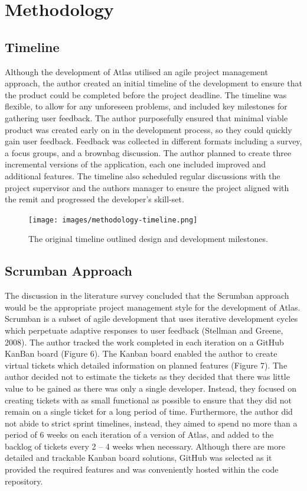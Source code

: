 \documentclass{article}
\begin{document}
\newpage

\section{Methodology}

\subsection{Timeline}

Although the development of Atlas utilised an agile project management approach, the author created an initial timeline of the development to ensure that the product could be completed before the project deadline. The timeline was flexible, to allow for any unforeseen problems, and included key milestones for gathering user feedback. The author purposefully ensured that minimal viable product was created early on in the development process, so they could quickly gain user feedback. Feedback was collected in different formats including a survey, a focus groups, and a brownbag discussion. The author planned to create three incremental versions of the application, each one included improved and additional features. The timeline also scheduled regular discussions with the project supervisor and the authors manager to ensure the project aligned with the remit and progressed the developer's skill-set.

\begin{figure}[!htb]
  \centering
      \texttt{[image: images/methodology-timeline.png]}
  \caption{The original timeline outlined design and development milestones.}
\end{figure}

\subsection{Scrumban Approach}

The discussion in the literature survey concluded that the Scrumban approach would be the appropriate project management style for the development of Atlas. Scrumban is a subset of agile development that uses iterative development cycles which perpetuate adaptive responses to user feedback (Stellman and Greene, 2008). The author tracked the work completed in each iteration on a GitHub KanBan board (Figure 6). The Kanban board enabled the author to create virtual tickets which detailed information on planned features (Figure 7). The author decided not to estimate the tickets as they decided that there was little value to be gained as there was only a single developer. Instead, they focused on creating tickets with as small functional as possible to ensure that they did not remain on a single ticket for a long period of time. Furthermore, the author did not abide to strict sprint timelines, instead, they aimed to spend no more than a period of 6 weeks on each iteration of a version of Atlas, and added to the backlog of tickets every 2 – 4 weeks when necessary. Although there are more detailed and trackable Kanban board solutions, GitHub was selected as it provided the required features and was conveniently hosted within the code repository. 
\end{document}
